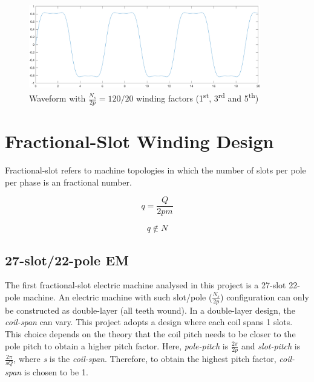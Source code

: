 \documentclass[a4paper, 11pt]{article}
\begin{document}
\begin{figure}[h]
	\begin{center}
		\includegraphics[width=0.9\textwidth]{Q1_MMFWaveform.png}
	\end{center}
	\caption{Waveform with $\frac{N_s}{2p}=120/20$ winding factors (1\textsuperscript{st}, 3\textsuperscript{rd} and 5\textsuperscript{th})}
	\label{fig:MMFWaveform}
\end{figure}


\section{Fractional-Slot Winding Design}

Fractional-slot refers to machine topologies in which the number of slots per pole per phase is an fractional number.

\begin{equation}
q=\frac{Q}{2pm}
\end{equation}

\begin{equation}
q\notin N
\end{equation}


\subsection{27-slot/22-pole EM}

\label{subsec:fractional-slot}

The first fractional-slot electric machine analysed in this project is a 27-slot 22-pole machine. An electric machine with such slot/pole ($\frac{N_s}{2p}$) configuration can only be constructed as double-layer (all teeth wound). In a double-layer design, the \textit{coil-span} can vary. This project adopts a design where each coil spans 1 slots. This choice depends on the theory that the coil pitch needs to be closer to the pole pitch to obtain a higher pitch factor. Here, \textit{pole-pitch} is $\frac{2\pi}{2p}$ and \textit{slot-pitch} is $\frac{2\pi}{sQ}$, where \textit{s} is the \textit{coil-span}. Therefore, to obtain the highest pitch factor, \textit{coil-span} is chosen to be 1.
\end{document}

